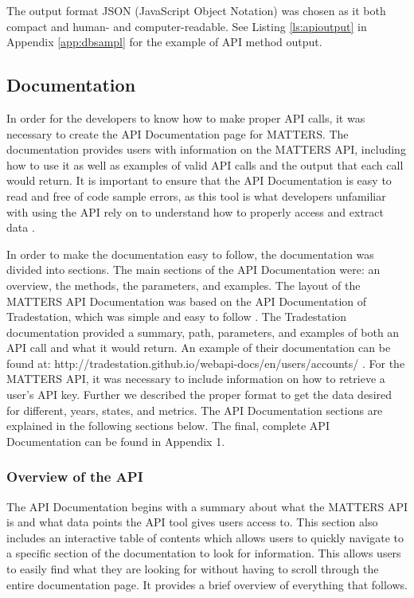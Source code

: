 				The output format JSON (JavaScript Object Notation) was chosen
				as it both compact and human- and computer-readable. See Listing 
				\ref{ls:apioutput} in Appendix \ref{app:dbsampl} for the example 
				of API method output. 
				
			\subsection{Documentation}
				
				In order for the developers to know how to make proper API calls, 
				it was necessary to create the API Documentation page for MATTERS. 
				The documentation provides users with information on the MATTERS API, including how to use it as well as examples of valid API calls and the output 
				that each call would return. It is important to ensure that the API Documentation 
				is easy to read and free of code sample errors, as this tool is 
				what developers unfamiliar with using the API rely on to understand how 
				to properly access and extract data \cite{errors}. 
				
				In order to make the documentation easy to follow, the documentation was divided into sections. 
				The main sections of the API Documentation were: an overview, the methods, 
				the parameters, and examples. The layout of the MATTERS API Documentation was based on the 
				API Documentation of Tradestation, which was simple and easy to follow \cite{apiex}. 
				The Tradestation documentation provided a summary, path, parameters, and examples of both an 
				API call and what it would return. An example of their documentation can be found at: 
				http://tradestation.github.io/webapi-docs/en/users/accounts/ \cite{apiex}. For the MATTERS API, 
				it was necessary to include information on how to retrieve a user's API key. 
				Further we described the proper format to get the data desired for different, years, states, 
				and metrics. The API Documentation sections are explained in the following sections below. 
				The final, complete API Documentation can be found in Appendix 1.
				
				
			\subsubsection{Overview of the API}
				
				The API Documentation begins with a summary about what the MATTERS API is and what 
				data points the API tool gives users access to. This section also includes an 
				interactive table of contents which allows users to quickly navigate to a specific 
				section of the documentation to look for information. This allows users to easily 
				find what they are looking for without having to scroll through the entire 
				documentation page. It provides a brief overview of everything that follows.
				
